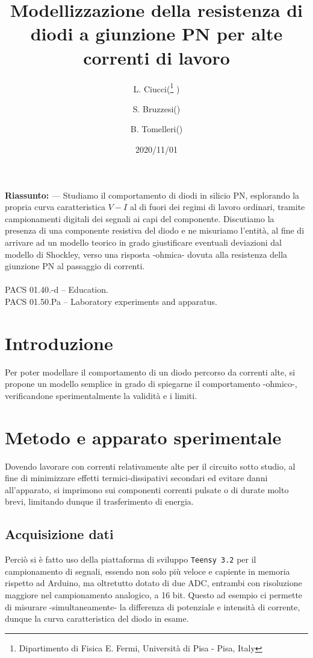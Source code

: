 \documentclass{article}[a4paper, oneside ,11pt]
\title{Modellizzazione della resistenza di diodi a giunzione PN per alte correnti di lavoro}
\author{L. Ciucci(\thanks{Dipartimento di Fisica E. Fermi, Universit\`a di Pisa - Pisa, Italy} ) \and S. Bruzzesi(\protect\footnotemark[1] ) \and B. Tomelleri(\protect\footnotemark[1] )}
\date{2020/11/01}
\begin{document}
\maketitle

\begin{mdframed}
\textbf{Riassunto:} --- Studiamo il comportamento di diodi in silicio PN, esplorando la propria curva caratteristica $V - I$ al di fuori dei regimi di lavoro ordinari, tramite campionamenti digitali dei segnali ai capi del componente. Discutiamo la presenza di una componente resistiva del diodo e ne misuriamo l'entità, al fine di arrivare ad un modello teorico in grado giustificare eventuali deviazioni dal modello di Shockley, verso una risposta -ohmica- dovuta alla resistenza della giunzione PN al passaggio di correnti.\\\\
PACS 01.40.-d – Education.\\
PACS 01.50.Pa – Laboratory experiments and apparatus.
\end{mdframed}

\section{Introduzione}
Per poter modellare il comportamento di un diodo percorso da correnti alte, si propone un modello semplice in grado di spiegarne il comportamento -ohmico-, verificandone sperimentalmente la validità e i limiti.
\section{Metodo e apparato sperimentale}
Dovendo lavorare con correnti relativamente alte per il circuito sotto studio, al fine di minimizzare effetti termici-dissipativi secondari ed evitare danni all'apparato, si imprimono sui componenti correnti pulsate o di durate molto brevi, limitando dunque il trasferimento di energia.
\subsection{Acquisizione dati}
Perciò si è fatto uso della piattaforma di sviluppo \verb+Teensy 3.2+\cite{teensy} per il campionamento di segnali, essendo non solo più veloce e capiente in memoria rispetto ad Arduino, ma oltretutto dotato di due ADC, entrambi con risoluzione maggiore nel campionamento analogico, a 16 bit. Questo ad esempio ci permette di misurare -simultaneamente- la differenza di potenziale e intensità di corrente, dunque la curva caratteristica del diodo in esame. 
\end{document}
